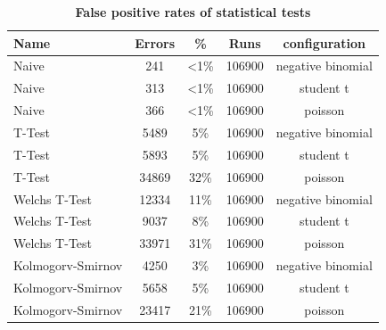 \begin{table}[htp]
  \centering
  \begin{tabular}{lcccc} %
    {\bf Name}        & {\bf Errors} & {\bf \%} & {\bf Runs} & {\bf configuration} \\
    \hline %
    Naive             & 241          & <1\%     & 106900     & negative binomial   \\
    Naive             & 313          & <1\%     & 106900     & student t           \\
    Naive             & 366          & <1\%     & 106900     & poisson             \\
    \hline
    T-Test            & 5489         & 5\%      & 106900     & negative binomial   \\
    T-Test            & 5893         & 5\%      & 106900     & student t           \\
    T-Test            & 34869        & 32\%     & 106900     & poisson             \\
    \hline
    Welchs T-Test     & 12334        & 11\%     & 106900     & negative binomial   \\
    Welchs T-Test     & 9037         & 8\%      & 106900     & student t           \\
    Welchs T-Test     & 33971        & 31\%     & 106900     & poisson             \\
    \hline
    Kolmogorv-Smirnov & 4250         & 3\%      & 106900     & negative binomial   \\
    Kolmogorv-Smirnov & 5658         & 5\%      & 106900     & student t           \\
    Kolmogorv-Smirnov & 23417        & 21\%     & 106900     & poisson             \\
    \hline
  \end{tabular}
  \caption[False positive rates of statistical tests]{\textbf{False positive rates of statistical tests}}
  \label{fig:false_positives}
\end{table}
